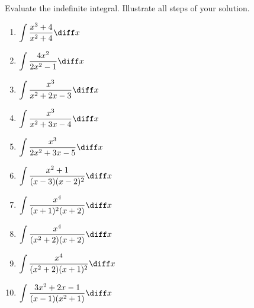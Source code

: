 Evaluate the indefinite integral. Illustrate all steps of your solution. 
\begin{multicols}{2}
\begin{enumerate}[ref={\fcProblemRef}]
\item $\displaystyle  \int \frac{x^3+4}{x^2+4}\diff x$

\item $\displaystyle\int \frac{4x^2 }{2x^2-1}\diff x$

\item $\displaystyle\int \frac{x^3}{x^2+2x-3}\diff x$

\item $\displaystyle\int \frac{x^3}{x^2+3x-4}\diff x$

\item $\displaystyle\int \frac{x^3 }{2x^2+3x-5}\diff x$ 

\item $\displaystyle \int \frac{x^2+1}{(x-3)(x-2)^2}\diff x$

\item $\displaystyle \int \frac{x^4 }{(x+1)^2(x+2) } \diff x$

\item $\displaystyle \int\frac{x^4 }{(x^2+2)(x+2) } \diff x$

\item \label{problemIntegral x^4/((x^2+2)(x+1)^2)} $\displaystyle\int \frac{x^4}{(x^2+2)(x+1)^2} \diff x $

\item \label{problemint(3x^2+2x-1)/((x-1)(x^2+1))dx} $\displaystyle\int \frac{3x^2 + 2x - 1}{(x-1)(x^2+1)} \diff x$


\end{enumerate}
\end{multicols}
